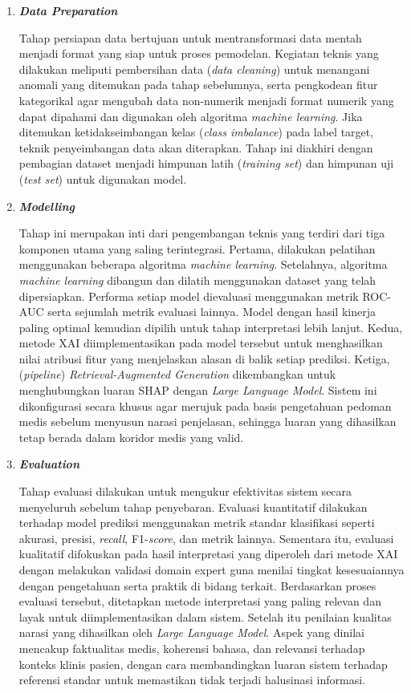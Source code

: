 \begin{enumerate}
    \item \textbf{\textit{Data Preparation}}
    
    Tahap persiapan data bertujuan untuk mentransformasi data mentah menjadi format yang siap untuk proses pemodelan. Kegiatan teknis yang dilakukan meliputi pembersihan data (\textit{data cleaning}) untuk menangani anomali yang ditemukan pada tahap sebelumnya, serta pengkodean fitur kategorikal agar mengubah data non-numerik menjadi format numerik yang dapat dipahami dan digunakan oleh algoritma \textit{machine learning}. Jika ditemukan ketidakseimbangan kelas (\textit{class imbalance}) pada label target, teknik penyeimbangan data akan diterapkan. Tahap ini diakhiri dengan pembagian dataset menjadi himpunan latih (\textit{training set}) dan himpunan uji (\textit{test set}) untuk digunakan model.

    \item \textbf{\textit{Modelling}}
    
    Tahap ini merupakan inti dari pengembangan teknis yang terdiri dari tiga komponen utama yang saling terintegrasi. Pertama, dilakukan pelatihan menggunakan beberapa algoritma \textit{machine learning}. Setelahnya, algoritma \textit{machine learning} dibangun dan dilatih menggunakan dataset yang telah dipersiapkan. Performa setiap model dievaluasi menggunakan metrik ROC-AUC serta sejumlah metrik evaluasi lainnya. Model dengan hasil kinerja paling optimal kemudian dipilih untuk tahap interpretasi lebih lanjut. Kedua, metode XAI diimplementasikan pada model tersebut untuk menghasilkan nilai atribusi fitur yang menjelaskan alasan di balik setiap prediksi. Ketiga, (\textit{pipeline}) \textit{Retrieval-Augmented Generation} dikembangkan untuk menghubungkan luaran SHAP dengan \textit{Large Language Model}. Sistem ini dikonfigurasi secara khusus agar merujuk pada basis pengetahuan pedoman medis sebelum menyusun narasi penjelasan, sehingga luaran yang dihasilkan tetap berada dalam koridor medis yang valid.

    \item \textbf{\textit{Evaluation}}
    
    Tahap evaluasi dilakukan untuk mengukur efektivitas sistem secara menyeluruh sebelum tahap penyebaran. Evaluasi kuantitatif dilakukan terhadap model prediksi menggunakan metrik standar klasifikasi seperti akurasi, presisi, \textit{recall}, F1-\textit{score}, dan metrik lainnya. Sementara itu, evaluasi kualitatif difokuskan pada hasil interpretasi yang diperoleh dari metode XAI dengan melakukan validasi domain expert guna menilai tingkat kesesuaiannya dengan pengetahuan serta praktik di bidang terkait. Berdasarkan proses evaluasi tersebut, ditetapkan metode interpretasi yang paling relevan dan layak untuk diimplementasikan dalam sistem. Setelah itu penilaian kualitas narasi yang dihasilkan oleh \textit{Large Language Model}. Aspek yang dinilai mencakup faktualitas medis, koherensi bahasa, dan relevansi terhadap konteks klinis pasien, dengan cara membandingkan luaran sistem terhadap referensi standar untuk memastikan tidak terjadi halusinasi informasi.


\end{enumerate}
